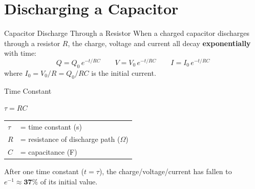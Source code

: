 \begin{center}
\end{center}

\section{Discharging a Capacitor}

\begin{definitionbox}{Capacitor Discharge Through a Resistor}
When a charged capacitor discharges through a resistor $R$, the charge, voltage and current all decay \textbf{exponentially} with time:
$$Q = Q_0\,e^{-t/RC} \qquad V = V_0\,e^{-t/RC} \qquad I = I_0\,e^{-t/RC}$$
where $I_0 = V_0/R = Q_0/RC$ is the initial current.
\end{definitionbox}

\begin{formulabox}{Time Constant}
\begin{center}
\Large $\tau = RC$
\end{center}
\vspace{0.3em}
\begin{tabular}{@{}ll@{}}
$\tau$ & = time constant (s) \\
$R$ & = resistance of discharge path ($\Omega$) \\
$C$ & = capacitance (F) \\
\end{tabular}
\vspace{0.4em}

After one time constant ($t = \tau$), the charge/voltage/current has fallen to $e^{-1} \approx \mathbf{37\%}$ of its initial value.
\end{formulabox}

